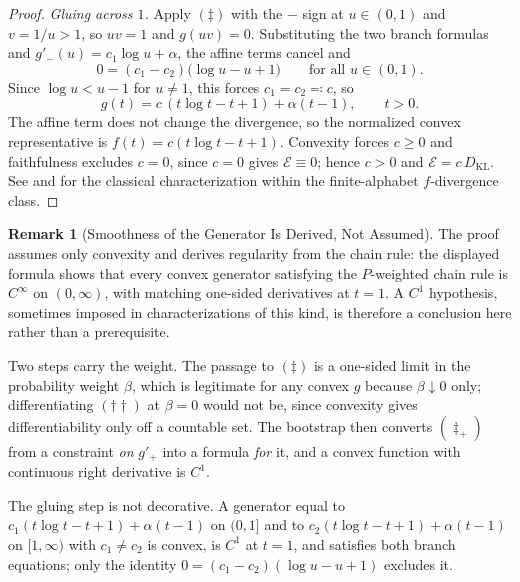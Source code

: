 \documentclass[12pt]{article}
\theoremstyle{definition}
\newtheorem{remark}[theorem]{Remark}
\begin{document}
\begin{proof}
\emph{Gluing across $1$.}  Apply $(\ddagger)$ with the $-$ sign at
$u\in(0,1)$ and $v=1/u>1$, so $uv=1$ and $g(uv)=0$.  Substituting the two
branch formulas and $g'_-(u)=c_1\log u+\alpha$, the affine terms cancel and
\[
0=(c_1-c_2)\bigl(\log u-u+1\bigr)
\qquad\text{for all }u\in(0,1).
\]
Since $\log u<u-1$ for $u\ne1$, this forces $c_1=c_2\eqqcolon c$, so
\[
g(t)=c\,(t\log t-t+1)+\alpha(t-1),
\qquad t>0.
\]
The affine term does not change the divergence, so the normalized convex
representative is $f(t)=c(t\log t-t+1)$.  Convexity forces $c\ge0$ and
faithfulness excludes $c=0$, since $c=0$ gives $\mathcal E\equiv0$; hence
$c>0$ and $\mathcal E=c\,D_{\mathrm{KL}}$.  See
\cite[Sec.~2.1]{csiszar1978} and \cite[Ch.~3]{cover} for the classical
characterization within the finite-alphabet $f$-divergence class.
\end{proof}

\begin{remark}[Smoothness of the Generator Is Derived, Not Assumed]
\label{rem:csiszar-automatic-smoothness}
The proof assumes only convexity and derives regularity from the chain rule:
the displayed formula shows that every convex generator satisfying the
$P$-weighted chain rule is $C^\infty$ on $(0,\infty)$, with matching one-sided
derivatives at $t=1$.  A $C^1$ hypothesis, sometimes imposed in
characterizations of this kind, is therefore a conclusion here rather than a
prerequisite.

Two steps carry the weight.  The passage to $(\ddagger)$ is a one-sided limit
in the probability weight $\beta$, which is legitimate for any convex $g$
because $\beta\downarrow0$ only; differentiating $(\dagger\dagger)$ at
$\beta=0$ would not be, since convexity gives differentiability only off a
countable set.  The bootstrap then converts $(\ddagger_+)$ from a constraint
\emph{on} $g'_+$ into a formula \emph{for} it, and a convex function with
continuous right derivative is $C^1$.

The gluing step is not decorative.  A generator equal to
$c_1(t\log t-t+1)+\alpha(t-1)$ on $(0,1]$ and to
$c_2(t\log t-t+1)+\alpha(t-1)$ on $[1,\infty)$ with $c_1\ne c_2$ is convex,
is $C^1$ at $t=1$, and satisfies both branch equations; only the identity
$0=(c_1-c_2)(\log u-u+1)$ excludes it.
\end{remark}
\end{document}
